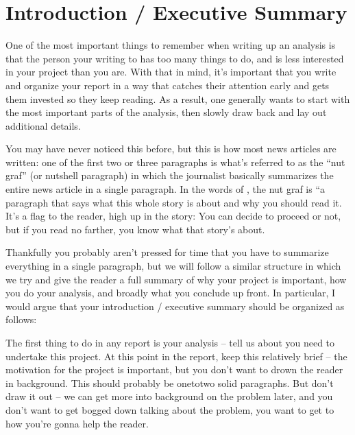 \documentclass[letterpaper,10pt,english]{jupyterBook}
\begin{document}
\section{Introduction / Executive Summary}
\label{\detokenize{40_in_practice/25_writing_to_stakeholders:introduction-executive-summary}}
\sphinxAtStartPar
One of the most important things to remember when writing up an analysis is that the person your writing to has too many things to do, and is  less interested in your project than you are. With that in mind, it’s important that you write and organize your report in a way that catches their attention early and gets them invested so they keep reading. As a result, one generally wants to start with the most important parts of the analysis, then slowly draw back and lay out additional details.

\sphinxAtStartPar
You may have never noticed this before, but this is how most news articles are written: one of the first two or three paragraphs is what’s referred to as the “nut graf” (or nutshell paragraph) in which the journalist basically summarizes the entire news article in a single paragraph. In the words of , the nut graf is “a paragraph that says what this whole story is about and why you should read it. It’s a flag to the reader, high up in the story: You can decide to proceed or not, but if you read no farther, you know what that story’s about.

\sphinxAtStartPar
Thankfully you probably aren’t  pressed for time that you have to summarize everything in a single paragraph, but we will follow a similar structure in which we try and give the reader a full summary of why your project is important, how you do your analysis, and broadly what you conclude up front. In particular, I would argue that your introduction / executive summary should be organized as follows:

\sphinxAtStartPar
{}

\sphinxAtStartPar
The first thing to do in any report is  your analysis – tell us about  you need to undertake this project. At this point in the report, keep this relatively brief – the motivation for the project is important, but you don’t want to drown the reader in background. This should probably be one\sphinxhyphen{}to\sphinxhyphen{}two solid paragraphs. But don’t draw it out – we can get more into background on the problem later, and you don’t want to get bogged down talking about the problem, you want to get to how you’re gonna help the reader.
\end{document}
